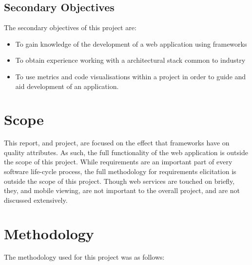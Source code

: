 \subsection{Secondary Objectives}

The secondary objectives of this project are: 

\begin{itemize}
\item To gain knowledge of the development of a web application using frameworks
\item To obtain experience working with a architectural stack common to industry
\item To use metrics and code visualisations within a project in order to guide and aid development of an application.
\end{itemize}

\section{Scope}

This report, and project, are focused on the effect that frameworks have on quality attributes. As such, the full functionality of the web application is outside the scope of this project. While requirements are an important part of every software life-cycle process, the full methodology for requirements elicitation is outside the scope of this project. Though web services are touched on briefly, they, and mobile viewing, are not important to the overall project, and are not discussed extensively. 

\section{Methodology}

The methodology used for this project was as follows:

